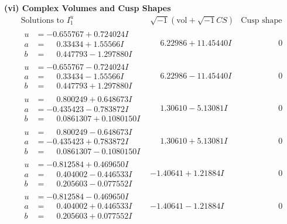 \documentclass[1p]{elsarticle_modified}
\theoremstyle{definition}
\newcommand{\I}{\sqrt{-1}}
\begin{document}
\newpage\flushleft \textbf{(vi) Complex Volumes and Cusp Shapes}
$$\begin{array}{c|c|c}  
\text{Solutions to }I^u_{1}& \I (\text{vol} + \sqrt{-1}CS) & \text{Cusp shape}\\
 \hline 
\begin{aligned}
u &= -0.655767 + 0.724024 I \\
a &= \phantom{-}0.33434 + 1.55566 I \\
b &= \phantom{-}0.447793 - 1.297880 I\end{aligned}
 & \phantom{-}6.22986 + 11.45440 I & \phantom{-0.000000 } 0 \\ \hline\begin{aligned}
u &= -0.655767 - 0.724024 I \\
a &= \phantom{-}0.33434 - 1.55566 I \\
b &= \phantom{-}0.447793 + 1.297880 I\end{aligned}
 & \phantom{-}6.22986 - 11.45440 I & \phantom{-0.000000 } 0 \\ \hline\begin{aligned}
u &= \phantom{-}0.800249 + 0.648673 I \\
a &= -0.435423 - 0.783872 I \\
b &= \phantom{-}0.0861307 + 0.1080150 I\end{aligned}
 & \phantom{-}1.30610 - 5.13081 I & \phantom{-0.000000 } 0 \\ \hline\begin{aligned}
u &= \phantom{-}0.800249 - 0.648673 I \\
a &= -0.435423 + 0.783872 I \\
b &= \phantom{-}0.0861307 - 0.1080150 I\end{aligned}
 & \phantom{-}1.30610 + 5.13081 I & \phantom{-0.000000 } 0 \\ \hline\begin{aligned}
u &= -0.812584 + 0.469650 I \\
a &= \phantom{-}0.404002 - 0.446533 I \\
b &= \phantom{-}0.205603 - 0.077552 I\end{aligned}
 & -1.40641 + 1.21884 I & \phantom{-0.000000 } 0 \\ \hline\begin{aligned}
u &= -0.812584 - 0.469650 I \\
a &= \phantom{-}0.404002 + 0.446533 I \\
b &= \phantom{-}0.205603 + 0.077552 I\end{aligned}
 & -1.40641 - 1.21884 I & \phantom{-0.000000 } 0 \\ \hline\begin{aligned}

\end{aligned}
\end{array}$$
\end{document}
